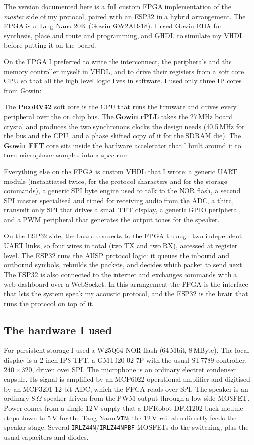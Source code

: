 \documentclass[a4paper,11pt]{article}
\begin{document}
The version documented here is a full custom FPGA implementation of the
\emph{master} side of my protocol, paired with an ESP32 in a hybrid arrangement.
The FPGA is a Tang Nano 20K (Gowin GW2AR-18). I used Gowin EDA for synthesis,
place and route and programming, and GHDL to simulate my VHDL before putting it
on the board.

On the FPGA I preferred to write the interconnect, the peripherals and the memory
controller myself in VHDL, and to drive their registers from a soft core CPU so
that all the high level logic lives in software. I used only three IP cores from
Gowin:

The \textbf{PicoRV32} soft core is the CPU that runs the firmware and drives every
peripheral over the on chip bus. The \textbf{Gowin rPLL} takes the 27\,MHz board
crystal and produces the two synchronous clocks the design needs (40.5\,MHz for
the bus and the CPU, and a phase shifted copy of it for the SDRAM die).
The \textbf{Gowin FFT} core sits inside the hardware accelerator that I built
around it to turn microphone samples into a spectrum.

Everything else on the FPGA is custom VHDL that I wrote: a generic UART module
(instantiated twice, for the protocol characters and for the storage commands), a
generic SPI byte engine used to talk to the NOR flash, a second SPI master
specialised and timed for receiving audio from the ADC, a third, transmit only
SPI that drives a small TFT display, a generic GPIO peripheral, and a PWM
peripheral that generates the output tones for the speaker.

On the ESP32 side, the board connects to the FPGA through two independent UART
links, so four wires in total (two TX and two RX), accessed at register level.
The ESP32 runs the AUSP protocol logic: it queues the inbound and outbound
symbols, rebuilds the packets, and decides which packet to send next. The ESP32
is also connected to the internet and exchanges commands with a web dashboard over
a WebSocket. In this arrangement the FPGA is the interface that lets the system
speak my acoustic protocol, and the ESP32 is the brain that runs the protocol on
top of it.

\subsection{The hardware I used}

For persistent storage I used a W25Q64 NOR flash (64\,Mbit, 8\,MByte). The local
display is a 2 inch IPS TFT, a GMT020-02-7P with the usual ST7789 controller,
$240\times320$, driven over SPI. The
microphone is an ordinary electret condenser capsule. Its signal is amplified by
an MCP6022 operational amplifier and digitised by an MCP3201 12-bit ADC, which the
FPGA reads over SPI. The speaker is an ordinary 8\,$\Omega$ speaker driven from
the PWM output through a low side MOSFET. Power comes from a single 12\,V supply
that a DFRobot DFR1202 buck module steps down to 5\,V for the Tang Nano
\texttt{VIN}; the 12\,V rail also directly feeds the speaker stage. Several
\texttt{IRLZ44N}/\texttt{IRLZ44NPBF} MOSFETs do the switching, plus the usual
capacitors and diodes.
\end{document}
